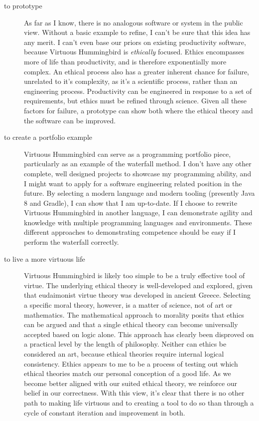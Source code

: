 \documentclass{article}
\begin{document}
\begin{description}

    \item[to prototype]
    As far as I know, there is no analogous software or system in the public view.
    Without a basic example to refine, I can't be sure that this idea has any merit.
    I can't even base our priors on existing productivity software, because Virtuous Hummingbird is \textit{ethically} focused.
    Ethics encompasses more of life than productivity, and is therefore exponentially more complex.
    An ethical process also has a greater inherent chance for failure, unrelated to it's complexity, as it's a scientific process, rather than an engineering process.
    Productivity can be engineered in response to a set of requirements, but ethics must be refined through science.
    Given all these factors for failure, a prototype can show both where the ethical theory and the software can be improved.
 
    \item[to create a portfolio example]
    Virtuous Hummingbird can serve as a programming portfolio piece, particularly as an example of the waterfall method.
    I don't have any other complete, well designed projects to showcase my programming ability, and I might want to apply for a software engineering related position in the future.
    By selecting a modern language and modern tooling (presently Java 8 and Gradle), I can show that I am up-to-date.
    If I choose to rewrite Virtuous Hummingbird in another language, I can demonstrate agility and knowledge with multiple programming languages and environments.
    These different approaches to demonstrating competence should be easy if I perform the waterfall correctly.
 
    \item[to live a more virtuous life]
    Virtuous Hummingbird is likely too simple to be a truly effective tool of virtue.
    The underlying ethical theory is well-developed and explored, given that eudaimonist virtue theory was developed in ancient Greece.
    Selecting a specific moral theory, however, is a matter of science, not of art or mathematics.
    The mathematical approach to morality posits that ethics can be argued and that a single ethical theory can become universally accepted based on logic alone.
    This approach has clearly been disproved on a practical level by the length of philosophy.
    Neither can ethics be considered an art, because ethical theories require internal logical consistency.
    Ethics appears to me to be a process of testing out which ethical theories match our personal conception of a good life.
    As we become better aligned with our suited ethical theory, we reinforce our belief in our correctness.
    With this view, it's clear that there is no other path to making life virtuous and to creating a tool to do so than through a cycle of constant iteration and improvement in both.
 
\end{description}
\end{document}
